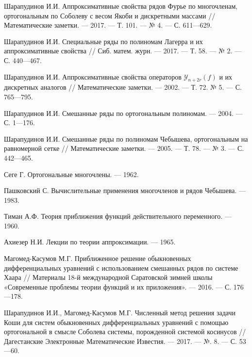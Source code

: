 \begin{thebibliography}{20}
Шарапудинов И.И. Аппроксимативные свойства рядов Фурье по многочленам, ортогональным по Соболеву с весом Якоби и дискретными массами // Математические заметки. --- 2017. --- Т. 101. --- № 4. --- С. 611---629.



Шарапудинов И.И. Специальные ряды по полиномам Лагерра и их аппроксимативные свойства // Сиб. матем. журн. --- 2017. --- Т. 58. --- № 2. --- С. 440---467.



Шарапудинов И.И. Аппроксимативные свойства операторов $\mathcal{Y}_{n+2r}(f)$ и их дискретных аналогов // Математические заметки. --- 2002. --- Т. 72. № 5. --- С. 765---795.



Шарапудинов И.И. Смешанные ряды по ортогональным полиномам. --- 2004. --- С. 1---176.



Шарапудинов И.И. Смешанные ряды по полиномам Чебышева, ортогональным на равномерной сетке // Математические заметки. --- 2005. --- Т. 78. --- № 3. --- С. 442---465.


Сеге Г. Ортогональные многочлены. --- 1962.



Пашковский С. Вычислительные применения многочленов и рядов Чебышева. --- 1983.



Тиман А.Ф. Теория приближения функций действительного переменного. --- 1960.



Ахиезер Н.И. Лекции по теории аппроксимации. --- 1965.



Магомед-Касумов М.Г. Приближенное решение обыкновенных дифференциальных уравнений с использованием смешанных рядов по системе Хаара // Материалы 18-й международной Саратовской зимней школы «Современные проблемы теории функций и их приложения». --- 2016. --- С. 176---178.



Шарапудинов И.И., Магомед-Касумов М.Г. Численный метод решения задачи Коши для систем обыкновенных дифференциальных уравнений с помощью ортогональной в смысле Соболева системы, порожденной системой косинусов // Дагестанские Электронные Математические Известия. --- 2017. --- №. 8. --- С. 53---60.




\end{thebibliography}
